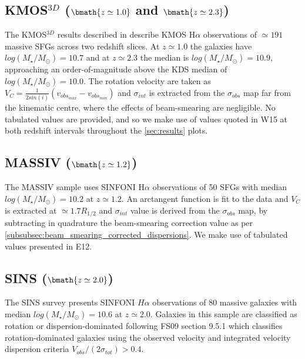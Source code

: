 \documentclass[fleqn,usenatbib]{mn2e}
\begin{document}
\subsection{KMOS$^{3D}$ ($\bmath{z\simeq1.0}$ and $\bmath{z\simeq2.3}$)}\label{subsec:kmos_3d}
The KMOS$^{3D}$ results described in \cite[W15]{Wisnioski2015} describe KMOS H$\alpha$ observations of $\simeq191$ massive SFGs across two redshift slices. 
At $z\simeq1.0$ the galaxies have $log(M_{\star}/M_{\odot})=10.7$ and at $z\simeq2.3$ the median is $log(M_{\star}/M_{\odot})=10.9$, approaching an order-of-magnitude above the KDS median of $log(M_{\star}/M_{\odot})=10.0$.   The rotation velocity are taken as $V_{C} = \frac{1}{2sin(i)}(v_{obs_{max}} - v_{obs_{min}})$ and $\sigma_{int}$ is extracted from the $\sigma_{obs}$ map far from the kinematic centre, where the effects of beam-smearing are negligible.
No tabulated values are provided, and so we make use of values quoted in W15 at both redshift intervals throughout the \cref{sec:results} plots.

\subsection{MASSIV ($\bmath{z\simeq1.2}$)}\label{subsec:MASSIV}
The MASSIV sample \citep[E12]{Epinat2012} uses SINFONI H$\alpha$ observations of 50 SFGs with median $log(M_{\star}/M_{\odot})=10.2$ at $z\simeq1.2$.
An arctangent function is fit to the data and $V_{C}$ is extracted at $\simeq1.7R_{1/2}$ and $\sigma_{int}$ value is derived from the $\sigma_{obs}$ map, by subtracting in quadrature the beam-smearing correction value as per \cref{subsubsec:beam_smearing_corrected_dispersions}.
We make use of tabulated values presented in E12.

\subsection{SINS ($\bmath{z\simeq2.0}$)}\label{subsec:SINS}
The SINS survey \citep[FS09]{ForsterSchreiber2009} presents SINFONI $H\alpha$ observations of 80 massive galaxies with median $log(M_{\star}/M_{\odot})=10.6$ at $z\simeq2.0$.
Galaxies in this sample are classified as rotation or dispersion-dominated following FS09 section 9.5.1 which classifies rotation-dominated galaxies using the observed velocity and integrated velocity dispersion criteria $V_{obs}/(2\sigma_{tot}) > 0.4$. \\
\end{document}
